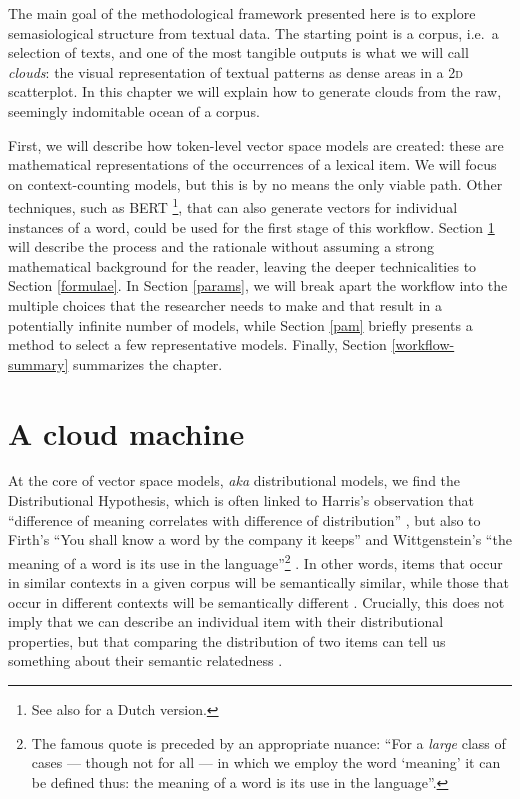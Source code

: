 \documentclass[
]{book}
\begin{document}
The main goal of the methodological framework presented here is to explore semasiological structure from textual data.
The starting point is a corpus, i.e.~a selection of texts, and one of the most tangible outputs is what we will call \emph{clouds}: the visual representation of textual patterns as dense areas in a \textsc{2d} scatterplot.
In this chapter we will explain how to generate clouds from the raw, seemingly indomitable ocean of a corpus.

First, we will describe how token-level vector space models are created: these are mathematical representations of the occurrences of a lexical item.
We will focus on context-counting models, but this is by no means the only viable path.
Other techniques, such as BERT \autocite{BERT}\footnote{See also \textcite{devries.etal_2019} for a Dutch version.}, that can also generate vectors for individual instances of a word, could be used for the first stage of this workflow.
Section \ref{vector-creation} will describe the process and the rationale without assuming a strong mathematical background for the reader, leaving the deeper technicalities to Section \ref{formulae}. In Section \ref{params}, we will break apart the workflow into the multiple choices that the researcher needs to make and that result in a potentially infinite number of models, while Section \ref{pam} briefly presents a method to select a few representative models. Finally, Section \ref{workflow-summary} summarizes the chapter.

\hypertarget{vector-creation}{%
\section{A cloud machine}\label{vector-creation}}

At the core of vector space models, \emph{aka} distributional models, we find the Distributional Hypothesis, which is often linked to Harris's observation that ``difference of meaning correlates with difference of distribution'' \autocite*[156]{harris_1954}, but also to Firth's ``You shall know a word by the company it keeps'' \autocite*[11]{firth_1957a} and Wittgenstein's ``the meaning of a word is its use in the language''\footnote{The famous quote is preceded by an appropriate nuance: ``For a \emph{large} class of cases --- though not for all --- in which we employ the word `meaning' it can be defined thus: the meaning of a word is its use in the language''.
} \autocite*[20]{wittgenstein_1958}.
In other words, items that occur in similar contexts in a given corpus will be semantically similar, while those that occur in different contexts will be semantically different \autocites[Ch. 6]{jurafsky.martin_2020}{lenci_2018}. Crucially, this does not imply that we can describe an individual item with their distributional properties, but that comparing the distribution of two items can tell us something about their semantic relatedness \autocite[19]{sahlgren_2006}.
\end{document}
